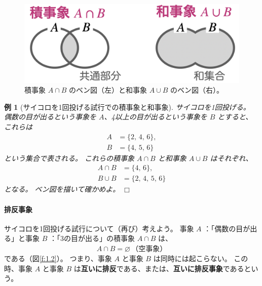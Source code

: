 \documentclass[12pt]{ltjsarticle}\usepackage{ifthen}\newcounter{enlarge}\setcounter{enlarge}{1}
\def\qed{\hfill $\Box$}
\newtheorem{eg}{例}
\begin{document}
\begin{figure}[] 
\centering 
\includegraphics[width=10truecm]{./figure/f1-1.png}
\captionsetup{width=.9\linewidth}
\caption{%
  積事象 $A \cap B$ のベン図（左）と和事象 $A \cup B$ のベン図（右）。
}
\label{f:1.1}
\end{figure}

\begin{eg}[サイコロを1回投げる試行での積事象と和事象]
  サイコロを1回投げる。
  偶数の目が出るという事象を $A$、4以上の目が出るという事象を $B$ とすると、これらは
  \begin{align}
    A &= \{2,\, 4,\, 6 \}, \label{eq:1.3} \\
    B &= \{4,\, 5,\, 6 \} \label{eq:1.4}
  \end{align}
  という集合で表される。
  これらの積事象 $A \cap B$ と和事象 $A \cup B$ はそれぞれ、
  \begin{align}
    A \cap B &= \{4,\, 6 \}, \label{eq:1.5} \\
    B \cup B &= \{2,\, 4,\, 5,\, 6 \} \label{eq:1.6}
  \end{align}
  となる。
  ベン図を描いて確かめよ。
\qed\end{eg}

\paragraph{排反事象}

サイコロを1回投げる試行について（再び）考えよう。
事象 $A$ ：「偶数の目が出る」と事象 $B$ ：「3の目が出る」の積事象 $A \cap B$ は、
\begin{align}
  A \cap B = \varnothing\, \text{（空事象）} \label{eq:1.7}
\end{align}
である（図\ref{f:1.2}）。
つまり、事象 $A$ と事象 $B$ は同時には起こらない。
この時、事象 $A$ と事象 $B$ は\textbf{互いに排反}である、または、\textbf{互いに排反事象}であるという。
\end{document}
